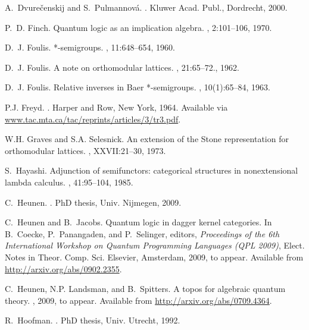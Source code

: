 \documentclass{article}
\begin{document}
\begin{thebibliography}{10}
A.~Dvure\v{c}enskij and S.~Pulmannov{\'a}.
.
\newblock Kluwer Acad. Publ., Dordrecht, 2000.

P.~D. Finch.
\newblock Quantum logic as an implication algebra.
, 2:101--106, 1970.

D.~J. Foulis.
 *-semigroups.
, 11:648--654, 1960.

D.~J. Foulis.
\newblock A note on orthomodular lattices.
, 21:65--72., 1962.

D.~J. Foulis.
\newblock Relative inverses in {Baer} *-semigroups.
, 10(1):65--84, 1963.

P.J. Freyd.
.
\newblock Harper and Row, New York, 1964.
\newblock Available via \url{www.tac.mta.ca/tac/reprints/articles/3/tr3.pdf}.

W.H. Graves and S.A. Selesnick.
\newblock An extension of the {Stone} representation for orthomodular lattices.
, XXVII:21--30, 1973.

S.~Hayashi.
\newblock Adjunction of semifunctors: categorical structures in nonextensional
  lambda calculus.
, 41:95--104, 1985.

C.~Heunen.
.
\newblock PhD thesis, Univ. Nijmegen, 2009.

C.~Heunen and B.~Jacobs.
\newblock Quantum logic in dagger kernel categories.
\newblock In B.~Coecke, P.~Panangaden, and P.~Selinger, editors, {\em
  Proceedings of the 6th International Workshop on Quantum Programming
  Languages (QPL 2009)}, Elect. Notes in Theor. Comp. Sci. Elsevier, Amsterdam,
  2009, to appear.
\newblock Available from \url{http://arxiv.org/abs/0902.2355}.

C.~Heunen, N.P. Landsman, and B.~Spitters.
\newblock A topos for algebraic quantum theory.
, 2009, to appear.
\newblock Available from \url{http://arxiv.org/abs/0709.4364}.

R.~Hoofman.
.
\newblock PhD thesis, Univ. Utrecht, 1992.


\end{thebibliography}
\end{document}
